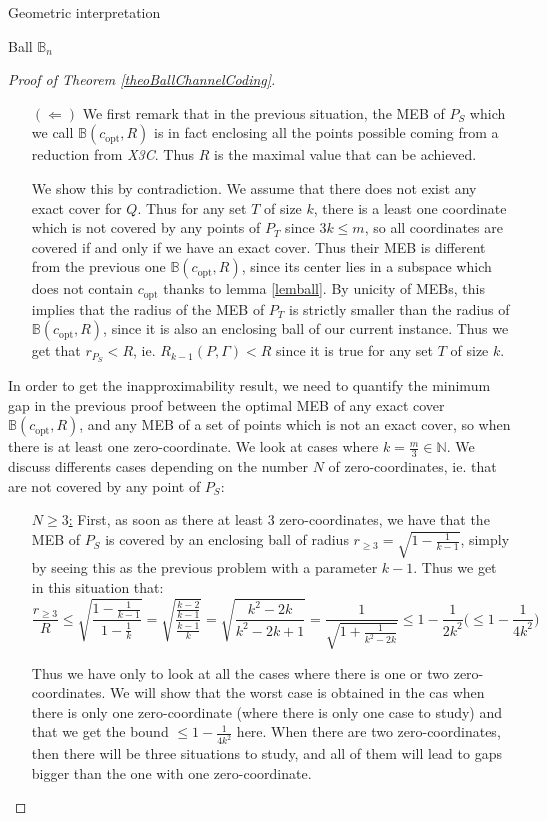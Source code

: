 \documentclass{article}
\theoremstyle{definition}
\theoremstyle{remark}
\begin{document}
\begin{subsection}{Geometric interpretation}
\begin{subsubsection}{Ball $\mathbb{B}_n$}
\begin{proof}[Proof of Theorem \ref{theoBallChannelCoding}]
\begin{itemize}
    \item[$(\Leftarrow)$] We first remark that in the previous situation, the MEB of $P_S$ which we call $\mathbb{B}(c_{\text{opt}},R)$ is in fact enclosing all the points possible coming from a reduction from \emph{X3C}. Thus $R$ is the maximal value that can be achieved.

      We show this by contradiction. We assume that there does not exist any exact cover for $Q$. Thus for any set $T$ of size $k$, there is a least one coordinate which is not covered by any points of $P_T$ since $3k \leq m$, so all coordinates are covered if and only if we have an exact cover. Thus their MEB is different from the previous one $\mathbb{B}(c_{\text{opt}},R)$, since its center lies in a subspace which does not contain $c_{\text{opt}}$ thanks to lemma \ref{lemball}. By unicity of MEBs, this implies that the radius of the MEB of $P_T$ is strictly smaller than the radius of $\mathbb{B}(c_{\text{opt}},R)$, since it is also an enclosing ball of our current instance. Thus we get that $r_{P_S} < R$, ie.  $R_{k-1}(P,\Gamma) < R$ since it is true for any set $T$ of size $k$.
      
    \end{itemize}

    In order to get the inapproximability result, we need to quantify the minimum gap in the previous proof between the optimal MEB of any exact cover $\mathbb{B}(c_{\text{opt}},R)$, and any MEB of a set of points which is not an exact cover, so when there is at least one zero-coordinate. We look at cases where $k = \frac{m}{3} \in \mathbb{N}$. We discuss differents cases depending on the number $N$ of zero-coordinates, ie. that are not covered by any point of $P_S$:
   
    \begin{itemize}
    \item[\underline{$N \geq 3$:}] First, as soon as there at least $3$ zero-coordinates, we have that the MEB of $P_S$ is covered by an enclosing ball of radius $r_{\geq 3} = \sqrt{1-\frac{1}{k-1}}$, simply by seeing this as the previous problem with a parameter $k-1$. Thus we get in this situation that:
      \[ \frac{r_{\geq 3}}{R} \leq \sqrt{\frac{1-\frac{1}{k-1}}{1-\frac{1}{k}}} = \sqrt{\frac{\frac{k-2}{k-1}}{\frac{k-1}{k}}} = \sqrt{\frac{k^2-2k}{k^2-2k + 1}} = \frac{1}{\sqrt{1 + \frac{1}{k^2-2k}}} \leq 1 - \frac{1}{2k^2} \Big(\leq 1 - \frac{1}{4k^2}\Big)\]
      
      Thus we have only to look at all the cases where there is one or two zero-coordinates. We will show that the worst case is obtained in the cas when there is only one zero-coordinate (where there is only one case to study) and that we get the bound $\leq 1 - \frac{1}{4k^2}$ here. When  there are two zero-coordinates, then there will be three situations to study, and all of them will lead to gaps bigger than the one with one zero-coordinate.


\end{itemize}
\end{proof}
\end{subsubsection}
\end{subsection}
\end{document}
